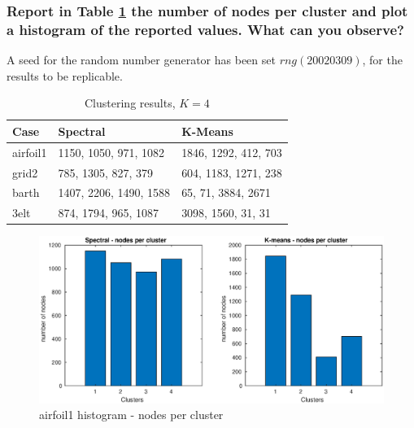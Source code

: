 \documentclass[unicode,11pt,a4paper,oneside,numbers=endperiod,openany]{scrartcl}
\begin{document}
\subsubsection{
    Report in Table \ref{table:ex2-3-table}
    the number of nodes per cluster and plot a histogram of the reported values.
    What can you observe?}

A seed for the random number generator has been set $rng(20020309)$, for the results to be replicable.

\begin{table}[H]
    \centering
    \caption{Clustering results, $K = 4$}
    \label{table:ex2-3-table}
    \begin{tabular}{l|l|l}
        Case     & Spectral               & K-Means              \\
        \hline
        airfoil1 & 1150, 1050, 971, 1082  & 1846, 1292, 412, 703 \\
        grid2    & 785, 1305, 827, 379    & 604, 1183, 1271, 238 \\
        barth    & 1407, 2206, 1490, 1588 & 65, 71, 3884, 2671   \\
        3elt     & 874, 1794, 965, 1087   & 3098, 1560, 31, 31   \\
    \end{tabular}
\end{table}

\begin{figure}[H]
    \centering
    \caption{airfoil1 histogram - nodes per cluster}
    \label{fig:ex2-3-airfoil1}
    \includegraphics[width=\textwidth, trim={0cm 0cm 0cm 0cm}, clip]{./img/ex2-3-airfoil1.eps}
\end{figure}
\end{document}
